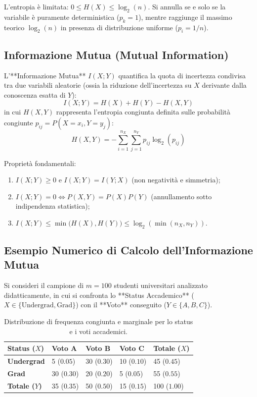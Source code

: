 L'entropia è limitata: $0 \le H(X) \le \log_2(n)$. Si annulla se e solo se la variabile è puramente deterministica ($p_k = 1$), mentre raggiunge il massimo teorico $\log_2(n)$ in presenza di distribuzione uniforme ($p_i = 1/n$).

\subsection{Informazione Mutua (Mutual Information)}
L'**Informazione Mutua** $I(X; Y)$ quantifica la quota di incertezza condivisa tra due variabili aleatorie (ossia la riduzione dell'incertezza su $X$ derivante dalla conoscenza esatta di $Y$):
\begin{equation}
    I(X; Y) = H(X) + H(Y) - H(X, Y)
\end{equation}
in cui $H(X, Y)$ rappresenta l'entropia congiunta definita sulle probabilità congiunte $p_{ij} = P(X = x_i, Y = y_j)$:
\begin{equation}
    H(X, Y) = -\sum_{i=1}^{n_X} \sum_{j=1}^{n_Y} p_{ij} \log_2(p_{ij})
\end{equation}

Proprietà fondamentali:
\begin{enumerate}[noitemsep]
    \item $I(X; Y) \ge 0$ e $I(X; Y) = I(Y; X)$ (non negatività e simmetria);
    \item $I(X; Y) = 0 \iff P(X, Y) = P(X)P(Y)$ (annullamento sotto indipendenza statistica);
    \item $I(X; Y) \le \min\big(H(X), H(Y)\big) \le \log_2(\min(n_X, n_Y))$.
\end{enumerate}

\subsection{Esempio Numerico di Calcolo dell'Informazione Mutua}
Si consideri il campione di $m = 100$ studenti universitari analizzato didatticamente, in cui si confronta lo **Status Accademico** ($X \in \{\text{Undergrad}, \text{Grad}\}$) con il **Voto** conseguito ($Y \in \{A, B, C\}$).

\begin{table}[htbp]
\centering
\small
\begin{tabularx}{\textwidth}{lYYYY}
\toprule
\textbf{Status ($X$)} & \textbf{Voto A} & \textbf{Voto B} & \textbf{Voto C} & \textbf{Totale ($X$)} \\
\midrule
\textbf{Undergrad} & 5 ($0.05$) & 30 ($0.30$) & 10 ($0.10$) & 45 ($0.45$) \\
\textbf{Grad} & 30 ($0.30$) & 20 ($0.20$) & 5 ($0.05$) & 55 ($0.55$) \\
\midrule
\textbf{Totale ($Y$)} & 35 ($0.35$) & 50 ($0.50$) & 15 ($0.15$) & 100 ($1.00$) \\
\bottomrule
\end{tabularx}
\caption{Distribuzione di frequenza congiunta e marginale per lo status e i voti accademici.}
\label{tab:dm-student-contingency}
\end{table}

